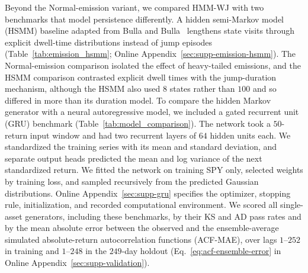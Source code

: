 Beyond the Normal-emission variant, we compared HMM-WJ with two
benchmarks that model persistence differently. A hidden semi-Markov
model (HSMM) baseline adapted from Bulla and
Bulla~\cite{bullaBulla2006} lengthens state visits through explicit
dwell-time distributions instead of jump episodes
(Table~\ref{tab:emission_hsmm}; Online
Appendix~\ref{sec:supp-emission-hsmm}). The Normal-emission comparison
isolated the effect of heavy-tailed emissions, and the HSMM
comparison contrasted explicit dwell times with the jump-duration
mechanism, although the HSMM also used $8$ states rather than $100$ and so
differed in more than its duration model. To compare the hidden Markov
generator with a neural autoregressive model, we
included a gated recurrent unit (GRU) benchmark
(Table~\ref{tab:model_comparison}). The network took a $50$-return input window and had two recurrent
layers of $64$ hidden units each. We standardized the training series with its mean and standard
deviation, and separate output heads predicted the mean and log
variance of the next standardized return. We fitted the network on training SPY only,
selected weights by training loss, and sampled recursively from
the predicted Gaussian distributions. Online
Appendix~\ref{sec:supp-gru} specifies the optimizer, stopping rule,
initialization, and recorded computational environment. We scored all single-asset generators,
including these benchmarks, by their KS and AD pass rates and by the mean absolute error between the observed and the
ensemble-average simulated absolute-return autocorrelation functions
(ACF-MAE), over lags $1$--$252$ in training and $1$--$248$ in the
$249$-day holdout (Eq.~\eqref{eq:acf-ensemble-error} in Online
Appendix~\ref{sec:supp-validation}).
